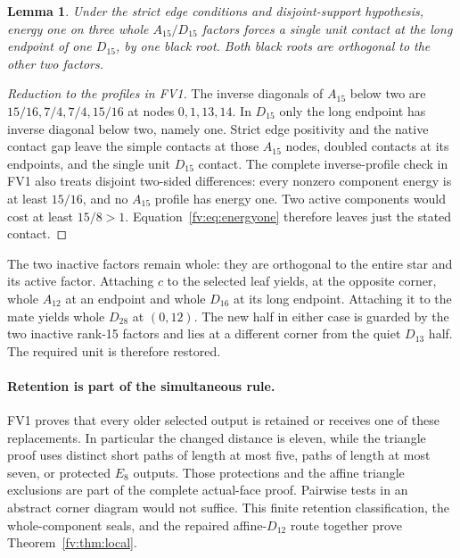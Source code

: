 \documentclass[11pt]{article}
\newtheorem{lemma}[theorem]{Lemma}
\theoremstyle{remark}\newtheorem{remark}[theorem]{Remark}
\numberwithin{equation}{section}
\begin{document}
\begin{lemma}\label{fv:lem:rank 15}
Under the strict edge conditions and disjoint-support hypothesis,
energy one on three whole $A_{15}/D_{15}$ factors forces a single
unit contact at the long endpoint of one $D_{15}$, by one black
root. Both black roots are orthogonal to the other two factors.
\end{lemma}
\begin{proof}[Reduction to the profiles in FV1]
The inverse diagonals of $A_{15}$ below two are
$15/16,\allowbreak 7/4,\allowbreak 7/4,\allowbreak 15/16$ at nodes $0,1,13,14$. In $D_{15}$ only
the long endpoint has inverse diagonal below two, namely one.
Strict edge positivity and the native contact gap leave the
simple contacts at those $A_{15}$ nodes, doubled contacts at its
endpoints, and the single unit $D_{15}$ contact. The complete
inverse-profile check in FV1 also treats disjoint two-sided
differences: every nonzero component energy is at least $15/16$,
and no $A_{15}$ profile has energy one. Two active components
would cost at least $15/8>1$. Equation~\eqref{fv:eq:energyone}
therefore leaves just the stated contact.
\end{proof}

The two inactive factors remain whole: they are orthogonal to
the entire star and its active factor. Attaching $c$ to the
selected leaf yields, at the opposite corner, whole $A_{12}$
at an endpoint and whole $D_{16}$ at its long endpoint.
Attaching it to the mate yields whole $D_{28}$ at $(0,12)$.
The new half in either case is guarded by the two inactive
rank-15 factors and lies at a different corner from the quiet
$D_{13}$ half. The required unit is therefore restored.

\paragraph{Retention is part of the simultaneous rule.}
FV1 proves that every older selected output is retained or receives
one of these replacements. In particular the changed distance is
eleven, while the triangle proof uses distinct short paths of
length at most five, paths of length at most seven, or protected
$E_8$ outputs. Those protections and the affine triangle exclusions
are part of the complete actual-face proof. Pairwise tests in an
abstract corner diagram would not suffice. This finite retention
classification, the whole-component seals, and the repaired
affine-$D_{12}$ route together prove Theorem~\ref{fv:thm:local}.
\end{document}
